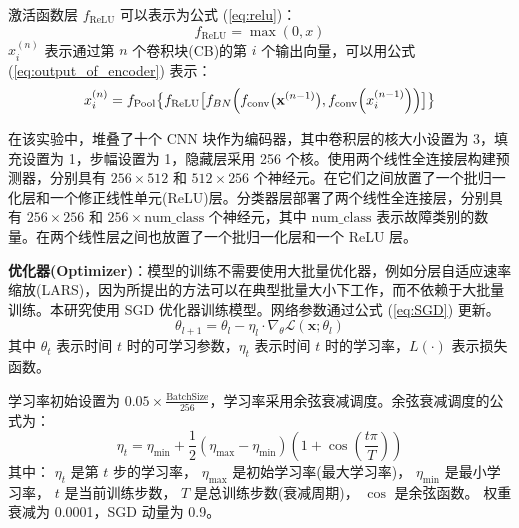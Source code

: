 \documentclass[master]{thesis-uestc}
\begin{document}
激活函数层 \( f_{\text{ReLU}} \) 可以表示为公式 (\ref{eq:relu})：
\begin{equation}
    f_{\text{ReLU}} = \max(0, x)
    \label{eq:relu}
\end{equation}
\( x_i^{(n)} \) 表示通过第 \( n \) 个卷积块(CB)的第 \( i \) 个输出向量，可以用公式 (\ref{eq:output_of_encoder}) 表示：
\begin{equation}
    \begin{aligned}
    x_i^{(n)} = f_{\text{Pool}}\bigl\{f_{\text{ReLU}}\bigl[f_{BN}\Bigl(f_{\text{conv}}\bigl(\mathbf{x}^{(n-1)}\bigr), f_{\text{conv}}\Bigl(x_i^{(n-1)}\Bigr)\Bigr)\bigr]\bigr\}
    \end{aligned}
    \label{eq:output_of_encoder}
\end{equation}

在该实验中，堆叠了十个 CNN 块作为编码器，其中卷积层的核大小设置为 3，填充设置为 1，步幅设置为 1，隐藏层采用 256 个核。使用两个线性全连接层构建预测器，分别具有 \( 256 \times 512 \) 和 \( 512 \times 256 \) 个神经元。在它们之间放置了一个批归一化层和一个修正线性单元(ReLU)层。分类器层部署了两个线性全连接层，分别具有 \( 256 \times 256 \) 和 \( 256 \times \text{num\_class} \) 个神经元，其中 \(\text{num\_class}\) 表示故障类别的数量。在两个线性层之间也放置了一个批归一化层和一个 ReLU 层。

\textbf{优化器(Optimizer)}：模型的训练不需要使用大批量优化器，例如分层自适应速率缩放(LARS)，因为所提出的方法可以在典型批量大小下工作，而不依赖于大批量训练。本研究使用 SGD 优化器训练模型。网络参数通过公式 (\ref{eq:SGD}) 更新。
\begin{equation}
    \theta_{l+1} = \theta_l - \eta_l \cdot \nabla_{\theta} \mathcal{L}(\mathbf{x}; \theta_l)
\label{eq:SGD}
\end{equation}
其中 \( \theta_t \) 表示时间 \( t \) 时的可学习参数，\( \eta_t \) 表示时间 \( t \) 时的学习率，\( L(\cdot) \) 表示损失函数。

学习率初始设置为 \( 0.05 \times \frac{\text{BatchSize}}{256} \)，学习率采用余弦衰减调度。余弦衰减调度的公式为：
\begin{equation}
    \eta_t = \eta_{\text{min}} + \frac{1}{2} (\eta_{\text{max}} - \eta_{\text{min}}) \left(1 + \cos\left(\frac{t \pi}{T}\right)\right)
    \label{eq:cos_decay}
\end{equation}
    其中：
        \(\eta_t\) 是第 \(t\) 步的学习率，
        \(\eta_{\text{max}}\) 是初始学习率(最大学习率)，
        \(\eta_{\text{min}}\) 是最小学习率，
        \(t\) 是当前训练步数，
        \(T\) 是总训练步数(衰减周期)，
        \(\cos\) 是余弦函数。
    权重衰减为 0.0001，SGD 动量为 0.9。
\end{document}

